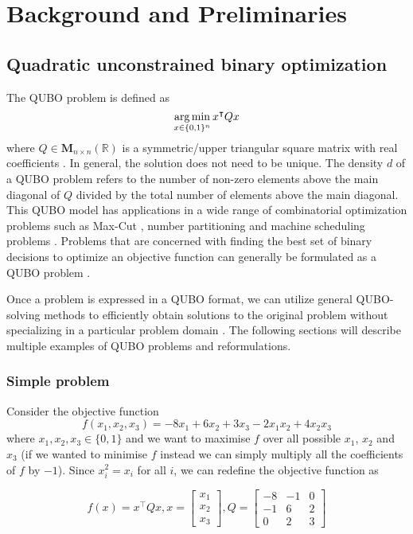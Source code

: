 
\chapter{Background and Preliminaries}
\vspace{2em}

\section{Quadratic unconstrained binary optimization}
The QUBO problem is defined as
\begin{equation} 
\operatorname*{arg\,min}_{x \in \{0, 1\}^n} x^\intercal Q x
\end{equation}
where $Q \in \boldsymbol{M}_{n\times n}(\mathbb{R})$ is a symmetric/upper triangular square matrix with real coefficients \cite{b1}. In general, the solution does not need to be unique. The density $d$ of a QUBO problem refers to the number of non-zero elements above the main diagonal of $Q$ divided by the total number of elements above the main diagonal. This QUBO model has applications in a wide range of combinatorial optimization problems such as Max-Cut \cite{b2}, number partitioning \cite{b3} and machine scheduling problems \cite{b4}. Problems that are concerned with finding the best set of binary decisions to optimize an objective function can generally be formulated as a QUBO problem \cite{b5}.

Once a problem is expressed in a QUBO format, we can utilize general QUBO-solving methods to efficiently obtain solutions to the original problem without specializing in a particular problem domain \cite{b1}. The following sections will describe multiple examples of QUBO problems and reformulations.

\subsection{Simple problem}
Consider the objective function \begin{equation}
f(x_1, x_2, x_3) = -8x_1 + 6x_2 + 3x_3 - 2 x_1 x_2 + 4 x_2 x_3
\end{equation} where $x_1, x_2, x_3 \in \{0, 1\}$ and we want to maximise $f$ over all possible $x_1$, $x_2$ and $x_3$ (if we wanted to minimise $f$ instead we can simply multiply all the coefficients of $f$ by $-1$). Since $x_i^2 = x_i$ for all $i$, we can redefine the objective function as 

\begin{equation}
f(x) = x^\intercal Q x, x = \begin{bmatrix}
x_1 \\
x_2 \\
x_3 
\end{bmatrix}, 
Q = \begin{bmatrix}
-8 & -1 & 0\\
-1 & 6 & 2\\
0 & 2 & 3
\end{bmatrix}
\end{equation}

